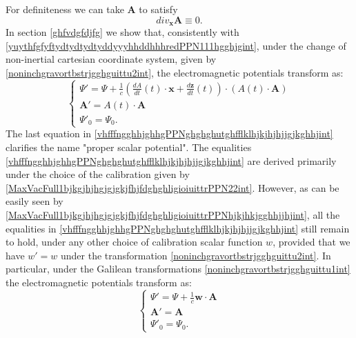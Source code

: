 \documentclass{article}
\theoremstyle{definition}
\theoremstyle{remark}
\renewcommand{\vec}[1]{\mathbf{#1}}
\newcommand{\er}{\eqref}
\newcommand{\er}{\eqref}
\begin{document}
For definiteness we can take $\vec A$ to satisfy
\begin{equation}\label{MaxVacFull1bjkgjhjhgjgjgkjfhjfdghghligioiuittrPPN22int}
div_{\vec x}\vec A\equiv 0.
\end{equation}
In section \ref{ghfvdgfdjfg} we show that, consistently with
\er{yuythfgfyftydtydtydtyddyyyhhddhhhredPPN111hgghjgint}, under the
change of non-inertial cartesian coordinate system, given by
\er{noninchgravortbstrjgghguittu2int}, the electromagnetic
potentials transform as:
\begin{equation}\label{vhfffngghhjghhgPPNghghghutghfflklhjkjhjhjjgjkghhjint}
\begin{cases}
\Psi'=
\Psi+\frac{1}{c}\left(\frac{dA}{dt}(t)\cdot\vec x+\frac{d\vec
z}{dt}(t)\right)\cdot\left(A(t)\cdot\vec A\right)
\\
\vec A'=A(t)\cdot \vec A\\
\Psi'_0=\Psi_0.
\end{cases}
\end{equation}
The last equation in
\er{vhfffngghhjghhgPPNghghghutghfflklhjkjhjhjjgjkghhjint} clarifies
the name "proper scalar potential". The equalities
\er{vhfffngghhjghhgPPNghghghutghfflklhjkjhjhjjgjkghhjint} are
derived primarily under the choice of the calibration given by
\er{MaxVacFull1bjkgjhjhgjgjgkjfhjfdghghligioiuittrPPN22int}.
However, as can be easily seen by
\er{MaxVacFull1bjkgjhjhgjgjgkjfhjfdghghligioiuittrPPNhjkjhkjgghhjjhjint},
all the equalities in
\er{vhfffngghhjghhgPPNghghghutghfflklhjkjhjhjjgjkghhjint} still
remain to hold, under any other choice of calibration scalar
function $w$, provided that we have $w'=w$ under the transformation
\er{noninchgravortbstrjgghguittu2int}. In particular, under the
Galilean transformations \er{noninchgravortbstrjgghguittu1int} the
electromagnetic potentials transform as:
\begin{equation}\label{vhfffngghhjghhgPPNghghghutghfflklhjkjhjhjjgjkghhjhhhjhgjguint}
\begin{cases}
\Psi'=
\Psi+\frac{1}{c}\vec w\cdot\vec A
\\
\vec A'=\vec A\\
\Psi'_0=\Psi_0.
\end{cases}
\end{equation}
\end{document}
